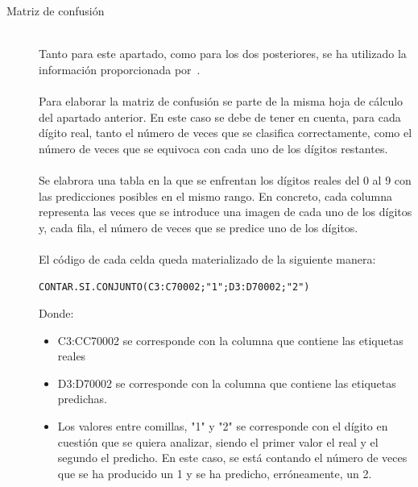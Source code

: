 \begin{description}
\begin{itemize}
{	}
	\end{itemize}
	\vspace{5pt}
	\item[Matriz de confusión] \hfill 
	\vspace{5pt}
	\\
	Tanto para este apartado, como para los dos posteriores, se ha utilizado la información proporcionada por~\cite{metrics}.\\
	\vspace{-10pt}
	\\
	Para elaborar la matriz de confusión se parte de la misma hoja de cálculo del apartado anterior. En este caso se debe de tener en cuenta, para cada dígito real, tanto el número de veces que se clasifica correctamente, como el número de veces que se equivoca con cada uno de los dígitos restantes.\\
	\vspace{-10pt}
	\\
	Se elabrora una tabla en la que se enfrentan los dígitos reales del 0 al 9 con las predicciones posibles en el mismo rango. En concreto, cada columna representa las veces que se introduce una imagen de cada uno de los dígitos y, cada fila, el número de veces que se predice uno de los dígitos.\\
	\vspace{-10pt}
	\\
	El código de cada celda queda materializado de la siguiente manera:
	\vspace{10pt}
	\begin{lstlisting}[frame=single]
		CONTAR.SI.CONJUNTO(C3:C70002;"1";D3:D70002;"2")
	\end{lstlisting}
	Donde:
	\begin{itemize}
		\item C3:CC70002 se corresponde con la columna que contiene las etiquetas reales
		\item D3:D70002 se corresponde con la columna que contiene las etiquetas predichas.
		\item Los valores entre comillas, "1" y "2" se corresponde con el dígito en cuestión que se quiera analizar, siendo el primer valor el real y el segundo el predicho. En este caso, se está contando el número de veces que se ha producido un 1 y se ha predicho, erróneamente, un 2.
	\end{itemize}
	

\end{description}
